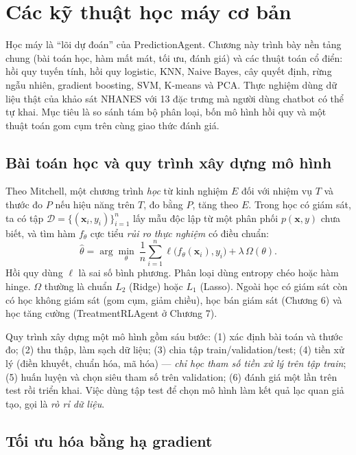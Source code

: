 \chapter{Các kỹ thuật học máy cơ bản}
\label{chap:ml}

Học máy là ``lõi dự đoán'' của PredictionAgent. Chương này trình bày nền tảng chung (bài toán học, hàm mất mát, tối ưu, đánh giá) và các thuật toán cổ điển: hồi quy tuyến tính, hồi quy logistic, KNN, Naive Bayes, cây quyết định, rừng ngẫu nhiên, gradient boosting, SVM, K-means và PCA. Thực nghiệm dùng dữ liệu thật của khảo sát NHANES với 13 đặc trưng mà người dùng chatbot có thể tự khai. Mục tiêu là so sánh tám bộ phân loại, bốn mô hình hồi quy và một thuật toán gom cụm trên cùng giao thức đánh giá.

\section{Bài toán học và quy trình xây dựng mô hình}

Theo Mitchell, một chương trình \emph{học} từ kinh nghiệm $E$ đối với nhiệm vụ $T$ và thước đo $P$ nếu hiệu năng trên $T$, đo bằng $P$, tăng theo $E$. Trong học có giám sát, ta có tập $\mathcal D=\{(\mathbf x_i, y_i)\}_{i=1}^n$ lấy mẫu độc lập từ một phân phối $p(\mathbf x, y)$ chưa biết, và tìm hàm $f_\theta$ cực tiểu \emph{rủi ro thực nghiệm} có điều chuẩn:
\begin{equation}
\hat\theta = \arg\min_\theta\ \frac1n \sum_{i=1}^n \ell\big(f_\theta(\mathbf x_i), y_i\big) + \lambda\, \Omega(\theta).
\label{eq:erm}
\end{equation}
Hồi quy dùng $\ell$ là sai số bình phương. Phân loại dùng entropy chéo hoặc hàm hinge. $\Omega$ thường là chuẩn $L_2$ (Ridge) hoặc $L_1$ (Lasso). Ngoài học có giám sát còn có học không giám sát (gom cụm, giảm chiều), học bán giám sát (Chương 6) và học tăng cường (TreatmentRLAgent ở Chương 7).

Quy trình xây dựng một mô hình gồm sáu bước: (1) xác định bài toán và thước đo; (2) thu thập, làm sạch dữ liệu; (3) chia tập train/validation/test; (4) tiền xử lý (điền khuyết, chuẩn hóa, mã hóa) — \emph{chỉ học tham số tiền xử lý trên tập train}; (5) huấn luyện và chọn siêu tham số trên validation; (6) đánh giá một lần trên test rồi triển khai. Việc dùng tập test để chọn mô hình làm kết quả lạc quan giả tạo, gọi là \emph{rò rỉ dữ liệu}.

\section{Tối ưu hóa bằng hạ gradient}

